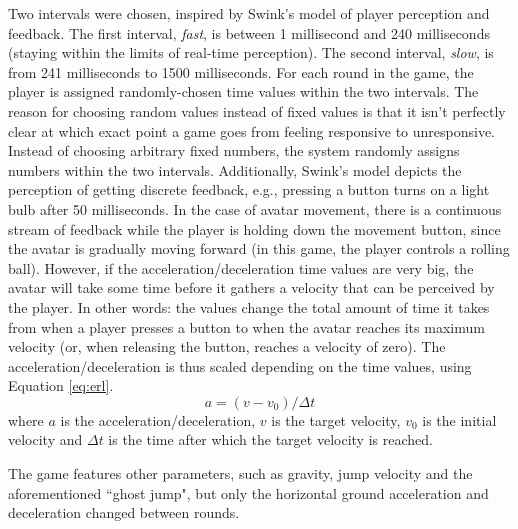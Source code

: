 Two intervals were chosen, inspired by Swink's model of player perception and feedback. The first interval, \textit{fast}, is between 1 millisecond and 240 milliseconds (staying within the limits of real-time perception). The second interval, \textit{slow}, is from 241 milliseconds to 1500 milliseconds. For each round in the game, the player is assigned randomly-chosen time values within the two intervals. The reason for choosing random values instead of fixed values is that it isn't perfectly clear at which exact point a game goes from feeling responsive to unresponsive. Instead of choosing arbitrary fixed numbers, the system randomly assigns numbers within the two intervals. Additionally, Swink's model depicts the perception of getting discrete feedback, e.g., pressing a button turns on a light bulb after 50 milliseconds. In the case of avatar movement, there is a continuous stream of feedback while the player is holding down the movement button, since the avatar is gradually moving forward (in this game, the player controls a rolling ball). However, if the acceleration/deceleration time values are very big, the avatar will take some time before it gathers a velocity that can be perceived by the player. In other words: the values change the total amount of time it takes from when a player presses a button to when the avatar reaches its maximum velocity (or, when releasing the button, reaches a velocity of zero). The acceleration/deceleration is thus scaled depending on the time values, using Equation \ref{eq:erl}.
\begin{equation} \label{eq:erl} %
a = (v - v_0)/{\Delta}t
\end{equation} 
where $a$ is the acceleration/deceleration, $v$ is the target velocity, $v_0$ is the initial velocity and ${\Delta}t$ is the time after which the target velocity is reached.


The game features other parameters, such as gravity, jump velocity and the aforementioned ``ghost jump", but only the horizontal ground acceleration and deceleration changed between rounds.

